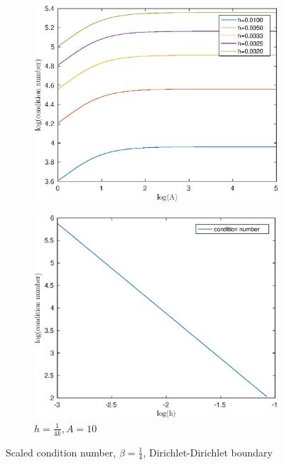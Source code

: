 \documentclass[12pt]{article}
\begin{document}
\begin{figure}[h!]
\centering
\begin{subfigure}{0.4\textwidth}
\includegraphics[width=\textwidth]{cond-A-4-DD}
\caption{}
\end{subfigure}
\hfill
\begin{subfigure}{0.4\textwidth}
\includegraphics[width=\textwidth]{cond-N-4-DD}
\caption{$h=\frac{1}{4k},A=10$}
\end{subfigure}
\caption{Scaled condition number, $\beta=\frac{1}{4}$, Dirichlet-Dirichlet boundary}
\end{figure}
\end{document}
